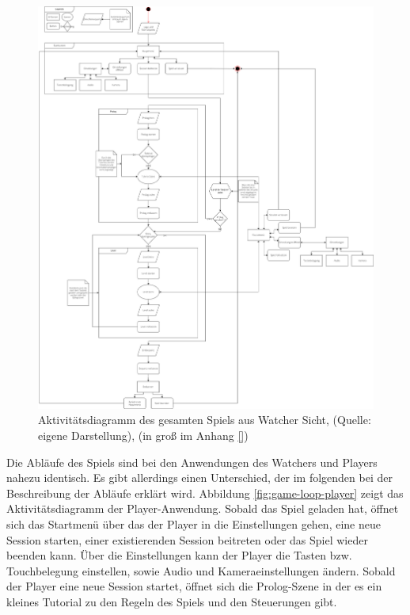 \begin{figure}[ht]
\centering
\includegraphics[width=1\linewidth]{content/pictures/GameLoop-Watcher.drawio.png}
\caption{Aktivitätsdiagramm des gesamten Spiels aus Watcher Sicht, (Quelle: eigene Darstellung), (in groß im Anhang \ref{})}
\label{fig:game-loop-watcher}
\end{figure}

Die Abläufe des Spiels sind bei den Anwendungen des Watchers und Players nahezu identisch. Es gibt allerdings einen Unterschied, der im folgenden bei der Beschreibung der Abläufe erklärt wird.
Abbildung \ref{fig:game-loop-player} zeigt das Aktivitätsdiagramm der Player-Anwendung. Sobald das Spiel geladen hat, öffnet sich das Startmenü über das der Player in die Einstellungen gehen, eine neue Session starten, einer existierenden Session beitreten oder das Spiel wieder beenden kann. Über die Einstellungen kann der Player die Tasten bzw. Touchbelegung einstellen, sowie Audio und Kameraeinstellungen ändern. Sobald der Player eine neue Session startet, öffnet sich die Prolog-Szene in der es ein kleines Tutorial zu den Regeln des Spiels und den Steuerungen gibt. 

